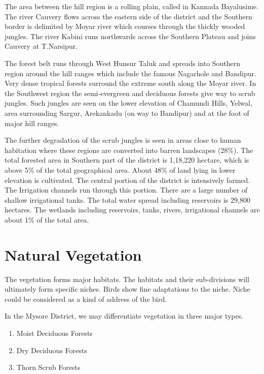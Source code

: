 The area between the hill region is a rolling plain, called 
in Kannada Bayalusime. The river Cauvery flows across the eastern 
side of the district and the Southern border is delimited by 
Moyar river which courses through the thickly wooded jungles. The 
river Kabini runs northwards across the Southern Plateau and 
joins Cauvery at T.Narsipur. 

The forest belt runs through West Hunsur Taluk and spreads 
into Southern region around the hill ranges which include the 
famous Nagarhole and Bandipur. Very dense tropical forests surround 
the extreme south along the Moyar river. In the Southwest 
region the semi-evergreen and deciduous forests give way to 
scrub jungles. Such jungles are seen on the lower elevation of 
Chamundi Hills, Yelwal, area surrounding Sargur, Arekankadu (on 
way to Bandipur) and at the foot of major hill ranges. 

The further degradation of the scrub jungles is seen in 
areas close to human habitation where these regions are converted 
into barren landscapes (28\%). The total forested area in Southern 
part of the district is 1,18,220 hectare, which is above 5\% of 
the total geographical area. About 48\% of land lying in lower 
elevation is cultivated. The central portion of the district is 
intensively farmed. The Irrigation channels run through this 
portion. There are a large number of shallow irrigational tanks. 
The total water spread including reservoirs is 29,800 hectares. 
The wetlands including reservoirs, tanks, rivers, irrigational 
channels are about 1\% of the total area. 

\chapter{Natural Vegetation}

The vegetation forms major habitats. The habitats and their 
sub-divisions will ultimately form specific niches. Birds show 
fine adaptations to the niche. Niche could be considered as a 
kind of address of the bird. 

In the Mysore District, we may differentiate vegetation in 
three major types. 
\begin{enumerate}
\itemsep=2pt
\item Moist Deciduous Forests 

\item Dry Deciduous Forests 

\item Thorn Scrub Forests 
\end{enumerate} 

